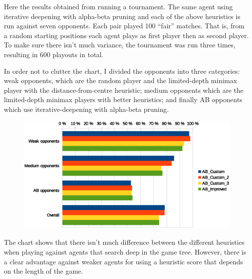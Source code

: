 \documentclass[11pt]{article}
\begin{document}
Here the results obtained from running a tournament. The same agent using iterative deepening with alpha-beta pruning and each of the above heuristics is run against seven opponents. Each pair played 100 ``fair'' matches. That is, from a random starting positions each agent plays as first player then as second player. To make sure there isn't much variance, the tournament was run three times, resulting in 600 playouts in total.

In order not to clutter the chart, I divided the opponents into three categories: weak opponents, which are the random player and the limited-depth minimax player with the distance-from-centre heuristic; medium opponents which are the limited-depth minimax players with better heuristics; and finally AB opponents which use iterative-deepening with alpha-beta pruning.

\begin{figure}\label{chart}
  \includegraphics[width=\textwidth]{chart.eps}
\end{figure}

The chart shows that there isn't much difference between the different heuristics when playing against agents that search deep in the game tree. However, there is a clear advantage against weaker agents for using a heuristic score that depends on the length of the game.
\end{document}
